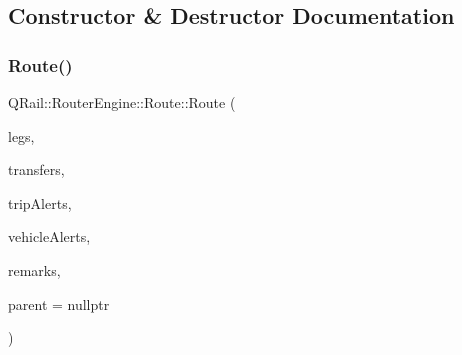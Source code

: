 \subsection{Constructor \& Destructor Documentation}
\mbox{\label{classQRail_1_1RouterEngine_1_1Route_a5063644c4df5409194b773a140189005}} 
\subsubsection{\texorpdfstring{Route()}{Route()}\hspace{0.1cm}{\footnotesize\ttfamily [1/2]}}
{\footnotesize\ttfamily Q\+Rail\+::\+Router\+Engine\+::\+Route\+::\+Route (\begin{DoxyParamCaption}\item[{const Q\+List$<$ \mbox{\hyperlink{classQRail_1_1RouterEngine_1_1RouteLeg}{Q\+Rail\+::\+Router\+Engine\+::\+Route\+Leg}} $\ast$ $>$ \&}]{legs,  }\item[{const Q\+List$<$ \mbox{\hyperlink{classQRail_1_1RouterEngine_1_1Transfer}{Q\+Rail\+::\+Router\+Engine\+::\+Transfer}} $\ast$ $>$ \&}]{transfers,  }\item[{const Q\+List$<$ \mbox{\hyperlink{classQRail_1_1AlertsEngine_1_1Message}{Q\+Rail\+::\+Alerts\+Engine\+::\+Message}} $\ast$ $>$ \&}]{trip\+Alerts,  }\item[{const Q\+List$<$ \mbox{\hyperlink{classQRail_1_1AlertsEngine_1_1Message}{Q\+Rail\+::\+Alerts\+Engine\+::\+Message}} $\ast$ $>$ \&}]{vehicle\+Alerts,  }\item[{const Q\+List$<$ \mbox{\hyperlink{classQRail_1_1AlertsEngine_1_1Message}{Q\+Rail\+::\+Alerts\+Engine\+::\+Message}} $\ast$ $>$ \&}]{remarks,  }\item[{Q\+Object $\ast$}]{parent = {\ttfamily nullptr} }\end{DoxyParamCaption})\hspace{0.3cm}{\ttfamily [explicit]}}

\mbox{\label{classQRail_1_1RouterEngine_1_1Route_a1a97cacc398b14f41b9c755b492b6b35}} 
